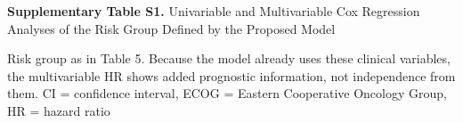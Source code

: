 \documentclass[border=8pt]{standalone}
\newif\ifshowtitle \showtitletrue
\newif\ifshownotes \shownotestrue
\begin{document}
\begin{minipage}{\wd\tablebox}
\ifshowtitle\noindent \textbf{Supplementary Table S1.} Univariable and Multivariable Cox Regression Analyses of the Risk Group Defined by the Proposed Model\par\vspace{4pt}\fi
\noindent\usebox\tablebox
\ifshownotes\par\vspace{3pt}\footnotesize\noindent Risk group as in Table 5. Because the model already uses these clinical variables, the multivariable HR shows added prognostic information, not independence from them. CI = confidence interval, ECOG = Eastern Cooperative Oncology Group, HR = hazard ratio\par\fi
\end{minipage}
\end{document}
